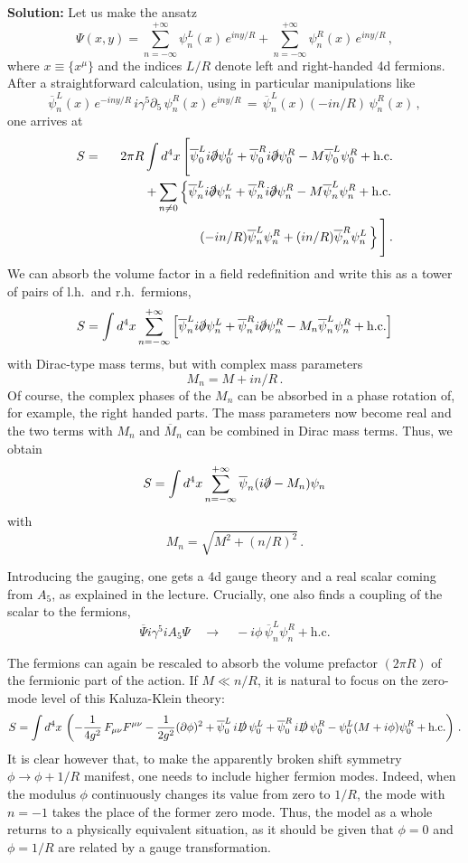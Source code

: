 \documentclass[12pt]{article}
\newcommand{\be}{\begin{equation}}
\newcommand{\ee}{\end{equation}}
\newcommand{\bea}{\begin{eqnarray}}
\newcommand{\eea}{\end{eqnarray}}
\newcommand{\ol}{\overline}
\numberwithin{equation}{section}
\begin{document}
\noindent
{\bf Solution:} Let us make the ansatz
\be
\Psi(x,y) = \sum_{n=-\infty}^{+\infty} \psi^L_n(x)\,e^{iny/R}+\sum_{n=-\infty}^{+\infty}
\psi^R_n(x)\,e^{iny/R}\,,
\ee
where $x\equiv\{x^\mu\}$ and the indices $L/R$ denote left and right-handed 4d fermions. After a straightforward calculation, using in particular manipulations like
\be
\ol{\psi}^L_n(x)\,e^{-iny/R}\,i\gamma^5\partial_5\, \psi^R_n(x)\,e^{iny/R}
\,=\,\ol{\psi}^L_n(x)(-in/R)\,\psi^R_n(x)\,,
\ee
one arrives at
\bea
S&=&2\pi R\int d^4x\,\Bigg[\ol{\psi}^L_0 i\slashed{\partial}\psi^L_0
+\ol{\psi}^R_0 i\slashed{\partial}\psi^R_0 - M \ol{\psi}^L_0 \psi^R_0+\mbox{h.c.}
\nonumber \\
&&
\hspace*{1cm}+\sum_{n\neq 0} \left\{\ol{\psi}^L_n i\slashed{\partial}\psi^L_n + \ol{\psi}^R_n i\slashed{\partial} \psi^R_n - M\ol{\psi}^L_n \psi^R_n+\mbox{h.c.}
\right.
\nonumber \\
&&
\hspace*{2cm}\left. (-in/R)\ol{\psi}_n^L\psi_n^R
+(in/R)\ol{\psi}_n^R\psi_n^L\,\right\}
\Bigg]\,.\label{beq}
\eea
We can absorb the volume factor in a field redefinition and write this as a tower of pairs of l.h.~and r.h.~fermions,
\be
S=\int d^4 x \sum_{n=-\infty}^{+\infty} \left[ \ol{\psi}^L_n i\slashed{\partial}\psi^L_n + \ol{\psi}^R_n i\slashed{\partial} \psi^R_n - M_n\ol{\psi}^L_n \psi^R_n +\mbox{h.c.}\right]
\ee
with Dirac-type mass terms, but with complex mass parameters
\be
M_n=M+in/R\,.
\ee
Of course, the complex phases of the $M_n$ can be absorbed in a phase rotation of, for example, the right handed parts. The mass parameters now become real and the two terms with $M_n$ and $\ol{M}_n$ can be combined in Dirac mass terms. Thus, we obtain
\be
S=\int d^4 x \sum_{n=-\infty}^{+\infty} \ol{\psi}_n (i\slashed{\partial}
-M_n)\psi_n
\ee
with
\be
M_n=\sqrt{M^2+(n/R)^2}\,.
\ee

Introducing the gauging, one gets a 4d gauge theory and a real scalar coming from $A_5$, as explained in the lecture. Crucially, one also finds a coupling of the scalar to the fermions,
\be
\ol{\Psi}i\gamma^5iA_5\Psi\quad \to\quad -i\phi\,\ol{\psi}_n^L \psi_n^R
+\mbox{h.c.}
\ee

The fermions can again be rescaled to absorb the volume prefactor $(2\pi R)$ of the fermionic part of the action. If $M\ll n/R$, it is natural to focus on the zero-mode level of this Kaluza-Klein theory:
\be
S=\int d^4 x\,\left(-\frac{1}{4g^2}\,F_{\mu\nu}F^{\mu\nu}-\frac{1}{2g^2}(
\partial \phi)^2 + \ol{\psi}_0^L\,i\slashed{D}\,\psi_0^L
+ \ol{\psi}_0^R\,i\slashed{D}\,\psi_0^R - \psi_0^L(M+i\phi)\psi_0^R +\mbox{h.c.}\right)\,.
\ee
It is clear however that, to make the apparently broken shift symmetry $\phi\to \phi+1/R$ manifest, one needs to include higher fermion modes. Indeed, when the modulus $\phi$ continuously changes its value from zero to $1/R$, the mode with $n=-1$ takes the place of the former zero mode. Thus, the model as a whole returns to a physically equivalent situation, as it should be given that $\phi=0$ and $\phi=1/R$ are related by a gauge transformation. 
\end{document}
